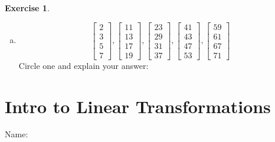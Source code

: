 \documentclass[10pt]{book}
\theoremstyle{definition}
\newtheorem{exercise}{Exercise}[section]
\newcommand{\name}[1][2.5in]{\vspace{-2.3em}\hfill Name: \underline{\hspace{#1}}}
\newcommand{\vect}[1]{\ensuremath{\boldsymbol{\mathbf{#1}}}}
\DeclareMathOperator{\Span}{Span}
\begin{document}
\begin{exercise}
\begin{multicols}{2}
\begin{enumerate}[(a)]
				\item
					$$
					\begin{bmatrix}  2\\ 3\\ 5\\ 7 \end{bmatrix},
					\begin{bmatrix} 11\\13\\17\\19 \end{bmatrix},
					\begin{bmatrix} 23\\29\\31\\37 \end{bmatrix},
					\begin{bmatrix} 41\\43\\47\\53 \end{bmatrix},
					\begin{bmatrix} 59\\61\\67\\71 \end{bmatrix}
					$$
					Circle one and explain your answer:
					\begin{center}
						 \qquad
					\end{center}
			\end{enumerate}
		\end{multicols}
\end{exercise}
\vfill




\newpage


\section[Introduction to Linear Transformations]{Intro to Linear Transformations}
\name[2in]
\end{document}
